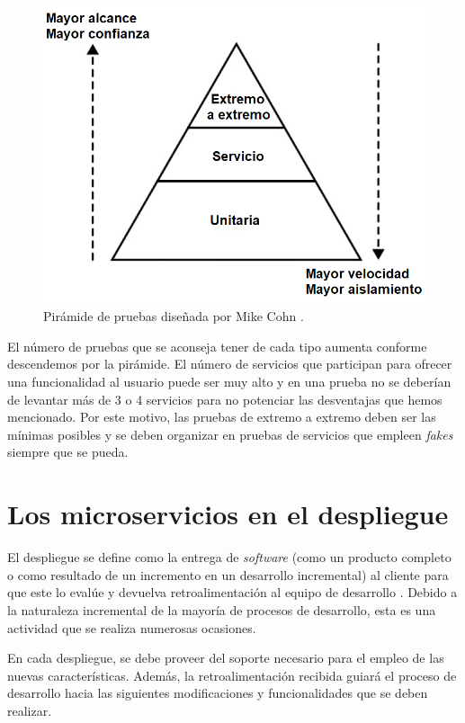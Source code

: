 \documentclass[11pt,spanish,listoffigures]{tfgetsinf}
\begin{document}
\begin{figure}[h]
\centering
\includegraphics[scale=0.5]{Cohn_Pyramid_ES}
\caption{Pirámide de pruebas diseñada por Mike Cohn \cite{Cohn2010}.}
\label{fig:Cohn_Pyramid_ES}
\end{figure}

El número de pruebas que se aconseja tener de cada tipo aumenta conforme descendemos por la pirámide. El número de servicios que participan para ofrecer una funcionalidad al usuario puede ser muy alto y en una prueba no se deberían de levantar más de 3 o 4 servicios para no potenciar las desventajas que hemos mencionado. Por este motivo, las pruebas de extremo a extremo deben ser las mínimas posibles y se deben organizar en pruebas de servicios que empleen \textit{fakes} siempre que se pueda.

\section{Los microservicios en el despliegue}

El despliegue se define como la entrega de \textit{software} (como un producto completo o como resultado de un incremento en un desarrollo incremental) al cliente para que este lo evalúe y devuelva retroalimentación al equipo de desarrollo \cite{Pressman}. Debido a la naturaleza incremental de la mayoría de procesos de desarrollo, esta es una actividad que se realiza numerosas ocasiones. 

En cada despliegue, se debe proveer del soporte necesario para el empleo de las nuevas características. Además, la retroalimentación recibida guiará el proceso de desarrollo hacia las siguientes modificaciones y funcionalidades que se deben realizar.
\end{document}
